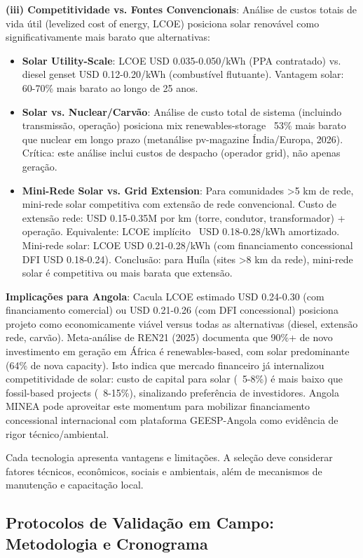 \documentclass[12pt, a4paper]{article}
\begin{document}
\textbf{(iii) Competitividade vs. Fontes Convencionais}: Análise de custos totais de vida útil (levelized cost of energy, LCOE) posiciona solar renovável como significativamente mais barato que alternativas:
\begin{itemize}
\item \textbf{Solar Utility-Scale}: LCOE USD 0.035-0.050/kWh (PPA contratado) vs. diesel genset USD 0.12-0.20/kWh (combustível flutuante). Vantagem solar: 60-70\% mais barato ao longo de 25 anos.
\item \textbf{Solar vs. Nuclear/Carvão}: Análise de custo total de sistema (incluindo transmissão, operação) posiciona mix renewables-storage ~53\% mais barato que nuclear em longo prazo (metanálise pv-magazine Índia/Europa, 2026). Crítica: este análise inclui custos de despacho (operador grid), não apenas geração.
\item \textbf{Mini-Rede Solar vs. Grid Extension}: Para comunidades >5 km de rede, mini-rede solar competitiva com extensão de rede convencional. Custo de extensão rede: USD 0.15-0.35M por km (torre, condutor, transformador) + operação. Equivalente: LCOE implícito ~USD 0.18-0.28/kWh amortizado. Mini-rede solar: LCOE USD 0.21-0.28/kWh (com financiamento concessional DFI USD 0.18-0.24). Conclusão: para Huíla (sites >8 km da rede), mini-rede solar é competitiva ou mais barata que extensão.
\end{itemize}

\textbf{Implicações para Angola}: Cacula LCOE estimado USD 0.24-0.30 (com financiamento comercial) ou USD 0.21-0.26 (com DFI concessional) posiciona projeto como economicamente viável versus todas as alternativas (diesel, extensão rede, carvão). Meta-análise de REN21 (2025) documenta que 90\%+ de novo investimento em geração em África é renewables-based, com solar predominante (64\% de nova capacity). Isto indica que mercado financeiro já internalizou competitividade de solar: custo de capital para solar (~5-8\%) é mais baixo que fossil-based projects (~8-15\%), sinalizando preferência de investidores. Angola MINEA pode aproveitar este momentum para mobilizar financiamento concessional internacional com plataforma GEESP-Angola como evidência de rigor técnico/ambiental.

Cada tecnologia apresenta vantagens e limitações. A seleção deve considerar fatores técnicos, econômicos, sociais e ambientais, além de mecanismos de manutenção e capacitação local.

\subsection{Protocolos de Validação em Campo: Metodologia e Cronograma}
\end{document}
